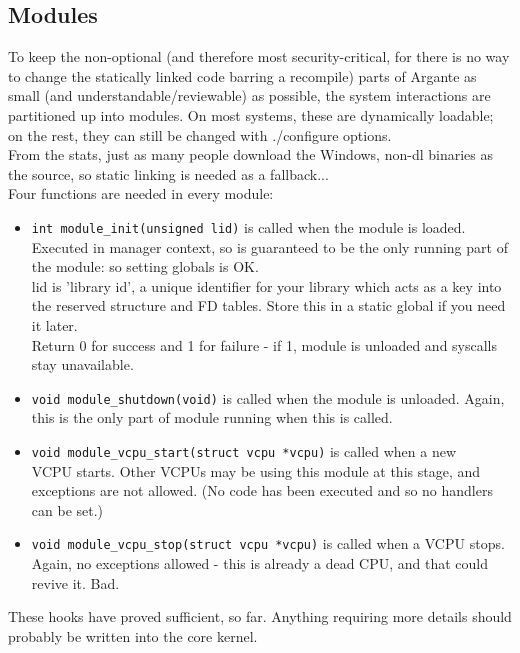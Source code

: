 \documentclass[a4paper,oneside,openany]{book}
\begin{document}
\subsection{Modules}
To keep the non-optional (and therefore most security-critical, for there is
no way to change the statically linked code barring a recompile) parts of
Argante as small (and understandable/reviewable) as possible, the system
interactions are partitioned up into modules. On most systems, these are
dynamically loadable; on the rest, they can still be changed with ./configure
options.\smallskip\\
From the stats, just as many people download the Windows, non-dl binaries as
the source, so static linking is needed as a fallback...\smallskip\\
Four functions are needed in every module:
\begin{itemize}
\item\texttt{int module\_init(unsigned lid)} is called when the module is loaded.
Executed in manager context, so is guaranteed to be the only running part of
the module: so setting globals is OK.\smallskip\\
lid is 'library id', a unique identifier for your library which acts as a key
into the reserved structure and FD tables. Store this in a static global if you
need it later.\smallskip\\
Return 0 for success and 1 for failure - if 1, module is unloaded and syscalls
stay unavailable.
\item\texttt{void module\_shutdown(void)} is called when the module is unloaded.
Again, this is the only part of module running when this is called.
\item\texttt{void module\_vcpu\_start(struct vcpu *vcpu)} is called when a new\\
VCPU starts. Other VCPUs may be using this module at this stage, and exceptions
are not allowed. (No code has been executed and so no handlers can be set.)
\item\texttt{void module\_vcpu\_stop(struct vcpu *vcpu)} is called when a VCPU stops.
Again, no exceptions allowed - this is already a dead CPU, and that could revive it.
Bad.
\end{itemize}
These hooks have proved sufficient, so far. Anything requiring more details
should probably be written into the core kernel.
\end{document}
